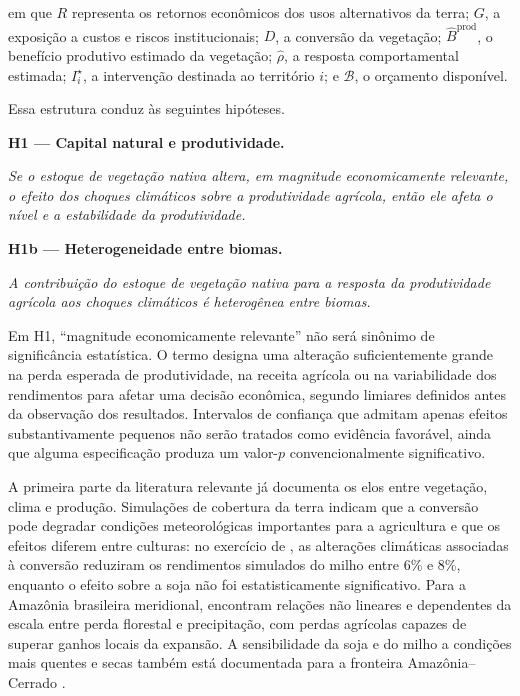 em que $R$ representa os retornos econômicos dos usos alternativos da terra; $G$, a exposição a custos e riscos institucionais; $D$, a conversão da vegetação; $\widehat{B}^{\mathrm{prod}}$, o benefício produtivo estimado da vegetação; $\widehat{\rho}$, a resposta comportamental estimada; $I_i^{\star}$, a intervenção destinada ao território $i$; e $\mathcal{B}$, o orçamento disponível.

Essa estrutura conduz às seguintes hipóteses.

\medskip

\noindent\textbf{H1 --- Capital natural e produtividade.}

\emph{Se o estoque de vegetação nativa altera, em magnitude economicamente relevante, o efeito dos choques climáticos sobre a produtividade agrícola, então ele afeta o nível e a estabilidade da produtividade.}

\medskip

\noindent\textbf{H1b --- Heterogeneidade entre biomas.}

\emph{A contribuição do estoque de vegetação nativa para a resposta da produtividade agrícola aos choques climáticos é heterogênea entre biomas.}



Em H1, ``magnitude economicamente relevante'' não será sinônimo de significância estatística. O termo designa uma alteração suficientemente grande na perda esperada de produtividade, na receita agrícola ou na variabilidade dos rendimentos para afetar uma decisão econômica, segundo limiares definidos antes da observação dos resultados. Intervalos de confiança que admitam apenas efeitos substantivamente pequenos não serão tratados como evidência favorável, ainda que alguma especificação produza um valor-$p$ convencionalmente significativo.

A primeira parte da literatura relevante já documenta os elos entre vegetação, clima e produção. Simulações de cobertura da terra indicam que a conversão pode degradar condições meteorológicas importantes para a agricultura e que os efeitos diferem entre culturas: no exercício de \cite{spera2020brazilian}, as alterações climáticas associadas à conversão reduziram os rendimentos simulados do milho entre 6\% e 8\%, enquanto o efeito sobre a soja não foi estatisticamente significativo. Para a Amazônia brasileira meridional, \cite{leitefilho2021deforestation} encontram relações não lineares e dependentes da escala entre perda florestal e precipitação, com perdas agrícolas capazes de superar ganhos locais da expansão. A sensibilidade da soja e do milho a condições mais quentes e secas também está documentada para a fronteira Amazônia--Cerrado \cite{rattis2021climatic}.

